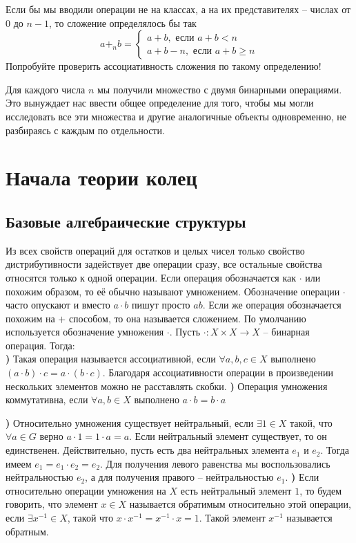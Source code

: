 \rm Если бы мы вводили операции не на классах, а на их представителях -- числах от $0$ до $n-1$, то сложение определялось бы так 
$$a+_n b = \begin{cases}a+b, \text{ если } a+b<n\\
a+b-n, \text{ если } a+b\geq n
\end{cases}$$
Попробуйте проверить ассоциативность сложения по такому определению!
\erm

Для каждого числа $n$ мы получили множество с двумя бинарными операциями. Это вынуждает нас ввести общее определение для того, чтобы мы могли исследовать все эти множества и другие аналогичные объекты одновременно, не разбираясь с каждым по отдельности.






\chapter{Начала теории колец}




\section{Базовые алгебраические структуры}

Из всех свойств операций для остатков и целых чисел только свойство дистрибутивности задействует две операции сразу, все остальные свойства относятся только к одной операции. 
\rm Если операция обозначается как $\cdot$ или похожим образом, то её обычно называют умножением. Обозначение операции $\cdot$ часто опускают и вместо $a\cdot b$ пишут просто $ab$. Если же операция обозначается похожим на $+$ способом, то она называется сложением. По умолчанию используется обозначение умножения $\cdot$.
\erm
Пусть $\cdot\colon X \times X \to X$ -- бинарная операция.
Тогда:\\
{\bf{})} Такая операция  называется ассоциативной, если $\forall a,b,c\in X$ выполнено $(a\cdot b) \cdot c=a\cdot (b \cdot c)$.
\rm
Благодаря ассоциативности операции в произведении нескольких элементов можно не расставлять скобки.
\erm
{\bf{})} Операция умножения коммутативна, если $\forall a,b \in X$ выполнено $a\cdot b= b\cdot a$

{\bf{})} Относительно умножения существует нейтральный, если $\exists 1 \in X$ такой, что $\forall a\in G$ верно $a\cdot 1= 1\cdot a= a$.
\rm Если нейтральный элемент существует, то он единственен. Действительно, пусть есть два нейтральных элемента $e_1$ и $e_2$. Тогда имеем $e_1=e_1\cdot e_2=e_2$. Для получения левого равенства мы воспользовались нейтральностью $e_2$, а для получения правого -- нейтральностью $e_1$.
\erm
{\bf{})} Если относительно операции умножения на $X$ есть нейтральный элемент $1$, то будем говорить, что элемент $x\in X$ называется обратимым относительно этой операции, если $\exists x^{-1} \in X$, такой что $x\cdot x^{-1}=x^{-1}\cdot x=1$. Такой элемент $x^{-1}$ называется обратным. 

